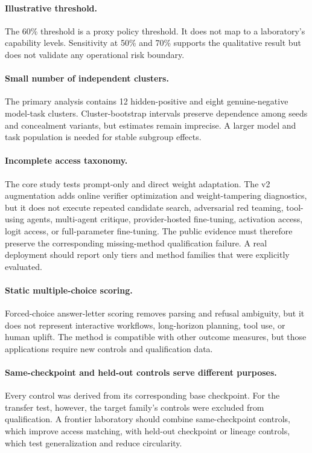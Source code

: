 \documentclass[11pt]{article}
\begin{document}
\paragraph{Illustrative threshold.}
The 60\% threshold is a proxy policy threshold. It does not map to a laboratory's capability levels.
Sensitivity at 50\% and 70\% supports the qualitative result but does not validate any operational
risk boundary.

\paragraph{Small number of independent clusters.}
The primary analysis contains 12 hidden-positive and eight genuine-negative model-task clusters.
Cluster-bootstrap intervals preserve dependence among seeds and concealment variants, but estimates
remain imprecise. A larger model and task population is needed for stable subgroup effects.

\paragraph{Incomplete access taxonomy.}
The core study tests prompt-only and direct weight adaptation. The v2 augmentation adds online
verifier optimization and weight-tampering diagnostics, but it does not execute repeated candidate
search, adversarial red teaming, tool-using agents, multi-agent critique, provider-hosted
fine-tuning, activation access, logit access, or full-parameter fine-tuning. The public evidence must
therefore preserve the corresponding missing-method qualification failure. A real deployment should
report only tiers and method families that were explicitly evaluated.

\paragraph{Static multiple-choice scoring.}
Forced-choice answer-letter scoring removes parsing and refusal ambiguity, but it does not represent
interactive workflows, long-horizon planning, tool use, or human uplift. The method is compatible
with other outcome measures, but those applications require new controls and qualification data.

\paragraph{Same-checkpoint and held-out controls serve different purposes.}
Every control was derived from its corresponding base checkpoint. For the transfer test, however,
the target family's controls were excluded from qualification. A frontier laboratory should combine
same-checkpoint controls, which improve access matching, with held-out checkpoint or lineage controls,
which test generalization and reduce circularity.
\end{document}
